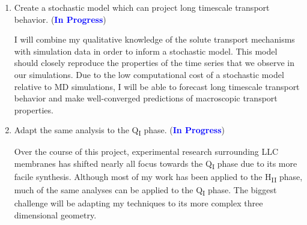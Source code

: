 \documentclass{article}
\begin{document}
\begin{enumerate}
    
    \item Create a stochastic model which can project long timescale 
    transport behavior. (\textcolor{blue}{\textbf{In Progress}})
    
    I will combine my qualitative knowledge of the solute transport mechanisms
    with simulation data in order to inform a stochastic model. This model
    should closely reproduce the properties of the time series that we observe 
    in our simulations. Due to the low computational cost of a stochastic model
    relative to MD simulations, I will be able to forecast long timescale transport
    behavior and make well-converged predictions of macroscopic transport properties.
           
    \item Adapt the same analysis to the Q\textsubscript{I} phase. (\textcolor{blue}{\textbf{In Progress}})
    
    Over the course of this project, experimental research surrounding
    LLC membranes has shifted nearly all focus towards the Q\textsubscript{I}
    phase due to its more facile synthesis.	Although most of my work has 
    been applied to the H\textsubscript{II} phase, much of the same analyses
    can be applied to the Q\textsubscript{I} phase. The biggest challenge will
    be adapting my techniques to its more complex three dimensional geometry.
    
%    
    
  \end{enumerate}
\end{document}
